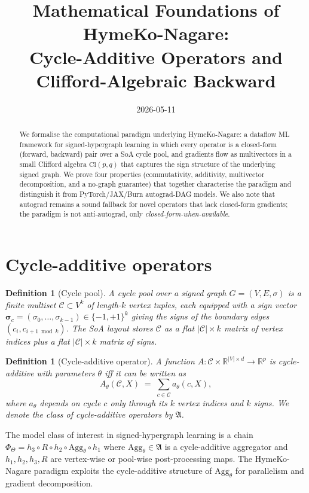 \documentclass[11pt]{article}
\title{Mathematical Foundations of HymeKo-Nagare:\\
  Cycle-Additive Operators and Clifford-Algebraic Backward}
\author{}
\date{2026-05-11}
\newtheorem{defn}[theorem]{Definition}
\begin{document}
\maketitle

\begin{abstract}
We formalise the computational paradigm underlying HymeKo-Nagare: a
dataflow ML framework for signed-hypergraph learning in which every
operator is a closed-form (forward, backward) pair over a SoA cycle
pool, and gradients flow as multivectors in a small Clifford algebra
$\mathrm{Cl}(p, q)$ that captures the sign structure of the underlying
signed graph. We prove four properties (commutativity, additivity,
multivector decomposition, and a no-graph guarantee) that together
characterise the paradigm and distinguish it from PyTorch/JAX/Burn
autograd-DAG models. We also note that autograd remains a sound
fallback for novel operators that lack closed-form gradients; the
paradigm is not anti-autograd, only \emph{closed-form-when-available}.
\end{abstract}

\section{Cycle-additive operators}

\begin{defn}[Cycle pool]
A \emph{cycle pool} over a signed graph $G = (V, E, \sigma)$ is a
finite multiset $\mathcal{C} \subset V^k$ of length-$k$ vertex
tuples, each equipped with a sign vector
$\boldsymbol\sigma_c = (\sigma_0, \ldots, \sigma_{k-1}) \in \{-1, +1\}^k$
giving the signs of the boundary edges $(c_i, c_{i+1 \bmod k})$.
The SoA layout stores $\mathcal{C}$ as a flat
$|\mathcal{C}| \times k$ matrix of vertex indices plus a flat
$|\mathcal{C}| \times k$ matrix of signs.
\end{defn}

\begin{defn}[Cycle-additive operator]
A function
$A : \mathcal{C} \times \mathbb{R}^{|V| \times d} \to \mathbb{R}^p$
is \emph{cycle-additive} with parameters $\theta$ iff it can be
written as
\[
  A_\theta(\mathcal{C}, X) \;=\; \sum_{c \in \mathcal{C}} a_\theta(c, X),
\]
where $a_\theta$ depends on cycle $c$ only through its $k$ vertex
indices and $k$ signs. We denote the class of cycle-additive
operators by $\mathfrak{A}$.
\end{defn}

The model class of interest in signed-hypergraph learning is a
chain $\Phi_\Theta = h_3 \circ R \circ h_2 \circ \mathrm{Agg}_\theta
\circ h_1$ where $\mathrm{Agg}_\theta \in \mathfrak{A}$ is a
cycle-additive aggregator and $h_1, h_2, h_3, R$ are vertex-wise
or pool-wise post-processing maps. The HymeKo-Nagare paradigm
exploits the cycle-additive structure of $\mathrm{Agg}_\theta$ for
parallelism and gradient decomposition.
\end{document}

